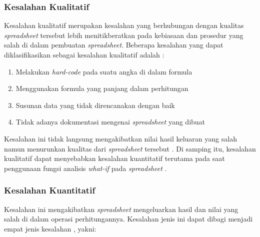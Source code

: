 \subsubsection{Kesalahan Kualitatif}
Kesalahan kualitatif merupakan kesalahan yang berhubungan dengan kualitas \textit{spreadsheet} tersebut lebih menitikberatkan pada kebiasaan dan prosedur yang salah di dalam pembuatan \textit{spreadsheet}. Beberapa kesalahan yang dapat diklasifikasikan sebagai kesalahan kualitatif adalah \citep{Powell2009}:

\begin{enumerate}
    \item Melakukan \textit{hard-code} pada suatu angka di dalam formula
    \item Menggunakan formula yang panjang dalam perhitungan
    \item Susunan data yang tidak direncanakan dengan baik
    \item Tidak adanya dokumentasi mengenai \textit{spreadsheet} yang dibuat
\end{enumerate}

Kesalahan ini tidak langsung mengakibatkan nilai hasil keluaran yang salah namun menurunkan kualitas dari \textit{spreadsheet} tersebut \citep{Rajalingham2001}. Di samping itu, kesalahan kualitatif dapat menyebabkan kesalahan kuantitatif terutama pada saat penggunaan fungsi analisis \textit{what-if} pada \textit{spreadsheet} \citep{Panko1998}.

\subsubsection{Kesalahan Kuantitatif}
Kesalahan ini mengakibatkan \textit{spreadsheet} mengeluarkan hasil dan nilai yang salah di dalam operasi perhitungannya. Kesalahan jenis ini dapat dibagi menjadi empat jenis kesalahan \citep{Howe2006}, yakni:


